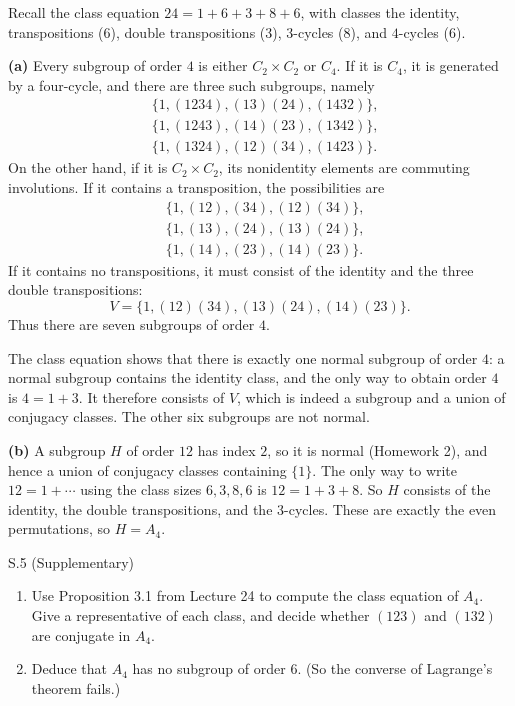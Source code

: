 \documentclass[11pt]{article}
\begin{document}
\begin{solution}
 Recall the class equation $24=1+6+3+8+6$, with classes the identity,
 transpositions ($6$), double transpositions ($3$), $3$-cycles ($8$), and
 $4$-cycles ($6$).

\textbf{(a)} Every subgroup of order $4$ is either $C_2\times C_2$ or $C_4$.
If it is $C_4$, it is generated by a four-cycle, and there are three
such subgroups, namely
\[
\begin{aligned}
  &\{1,(1234),(13)(24),(1432)\},\\
  &\{1,(1243),(14)(23),(1342)\},\\
  &\{1,(1324),(12)(34),(1423)\}.
\end{aligned}
\]
On the other hand, if it is $C_2\times C_2$, its nonidentity elements
are commuting involutions. If it contains a transposition, the
possibilities are
\[
\begin{aligned}
  &\{1,(12),(34),(12)(34)\},\\
  &\{1,(13),(24),(13)(24)\},\\
  &\{1,(14),(23),(14)(23)\}.
\end{aligned}
\]
If it contains no transpositions, it must consist of the identity
and the three double transpositions:
\[
  V=\{1,(12)(34),(13)(24),(14)(23)\}.
\]
Thus there are seven subgroups of order $4$.

The class equation shows that there is exactly one normal subgroup
of order $4$: a normal subgroup contains the identity class, and the
only way to obtain order $4$ is $4=1+3$. It therefore consists of
$V$, which is indeed a subgroup and a union of conjugacy classes.
The other six subgroups are not normal.

\textbf{(b)} A subgroup $H$ of order $12$ has index $2$, so it is normal
(Homework 2), and hence a union of conjugacy classes containing $\{1\}$.
 The only way to write $12=1+\cdots$ using the class sizes $6,3,8,6$ is $12=1+3+8$.
 So $H$ consists of the identity, the double transpositions, and the
$3$-cycles. These are exactly the even permutations, so $H=A_4$.
\end{solution}

\begin{exercise}{S.5 (Supplementary)}
\begin{enumerate}[label=\textbf{(\alph*)}]
  \item Use Proposition 3.1 from Lecture 24 to compute the class equation
        of $A_4$. Give a representative of each class, and decide whether
        $(123)$ and $(132)$ are conjugate in $A_4$.
  \item Deduce that $A_4$ has no subgroup of order $6$. (So the converse of
        Lagrange's theorem fails.)
\end{enumerate}
\end{exercise}
\end{document}
